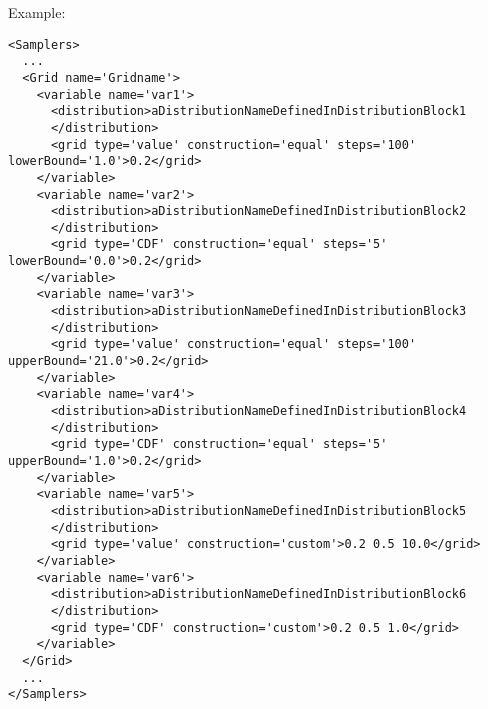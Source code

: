 Example:
\begin{lstlisting}[style=XML,morekeywords={construction,steps,lowerBound,upperBound}]
<Samplers>
  ...
  <Grid name='Gridname'> 
    <variable name='var1'> 
      <distribution>aDistributionNameDefinedInDistributionBlock1
      </distribution> 
      <grid type='value' construction='equal' steps='100' lowerBound='1.0'>0.2</grid> 
    </variable> 
    <variable name='var2'> 
      <distribution>aDistributionNameDefinedInDistributionBlock2
      </distribution> 
      <grid type='CDF' construction='equal' steps='5' lowerBound='0.0'>0.2</grid> 
    </variable>
    <variable name='var3'> 
      <distribution>aDistributionNameDefinedInDistributionBlock3
      </distribution> 
      <grid type='value' construction='equal' steps='100' upperBound='21.0'>0.2</grid> 
    </variable> 
    <variable name='var4'> 
      <distribution>aDistributionNameDefinedInDistributionBlock4
      </distribution> 
      <grid type='CDF' construction='equal' steps='5' upperBound='1.0'>0.2</grid> 
    </variable>
    <variable name='var5'> 
      <distribution>aDistributionNameDefinedInDistributionBlock5
      </distribution> 
      <grid type='value' construction='custom'>0.2 0.5 10.0</grid> 
    </variable> 
    <variable name='var6'> 
      <distribution>aDistributionNameDefinedInDistributionBlock6
      </distribution> 
      <grid type='CDF' construction='custom'>0.2 0.5 1.0</grid> 
    </variable>
  </Grid>
  ...
</Samplers>
\end{lstlisting}


